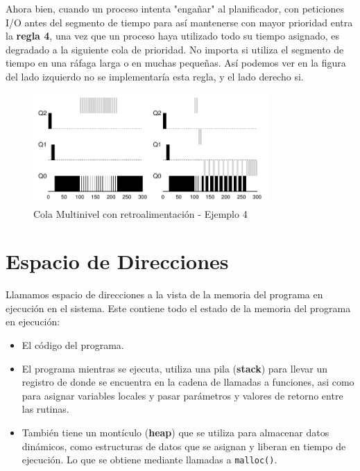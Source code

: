 \documentclass{article}
\begin{document}
Ahora bien, cuando un proceso intenta "engañar" al planificador, con peticiones I/O antes del segmento de tiempo para así mantenerse con mayor prioridad entra la \textbf{regla 4}, una vez que un proceso haya utilizado todo su tiempo asignado, es degradado a la siguiente cola de prioridad. No importa si utiliza el segmento de tiempo en una ráfaga larga o en muchas pequeñas. Así podemos ver en la figura del lado izquierdo no se implementaría esta regla, y el lado derecho si.

\begin{figure}[h]
    \centering
    \includegraphics[width=0.8\textwidth]{src/mlfq4.png}
    \caption{Cola Multinivel con retroalimentación - Ejemplo 4}
\end{figure}


\newpage
\section{Espacio de Direcciones}
Llamamos espacio de direcciones a la vista de la memoria del programa en ejecución en el sistema. Este contiene todo el estado de la memoria del programa en ejecución:
\begin{itemize}
    \item El código del programa.
    \item El programa mientras se ejecuta, utiliza una pila (\textbf{stack}) para llevar un registro de donde se encuentra en la cadena de llamadas a funciones, asi como para asignar variables locales y pasar parámetros y valores de retorno entre las rutinas.
    \item También tiene un montículo (\textbf{heap}) que se utiliza para almacenar datos dinámicos, como estructuras de datos que se asignan y liberan en tiempo de ejecución. Lo que se obtiene mediante llamadas a \texttt{malloc()}.
\end{itemize}
\end{document}
